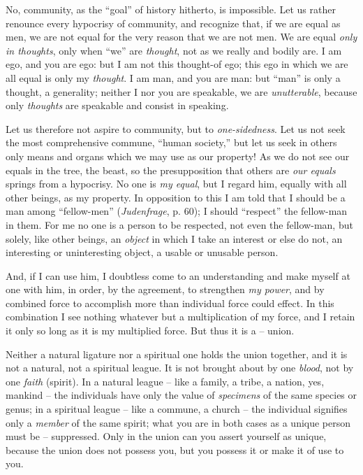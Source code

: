 \documentclass[12pt,a4paper]{book}
\begin{document}
No, community, as the ``goal'' of history hitherto, is impossible. Let us 
rather renounce every hypocrisy of community, and recognize that, if we are 
equal as men, we are not equal for the very reason that we are not men. We are 
equal \textit{only in thoughts}, only when ``we'' are \textit{thought}, not 
as we really and bodily are. I am ego, and you are ego: but I am not this 
thought-of ego; this ego in which we are all equal is only my 
\textit{thought}. I am man, and you are man: but ``man'' is only a thought, 
a generality; neither I nor you are speakable, we are \textit{unutterable}, 
because only \textit{thoughts} are speakable and consist in speaking.

Let us therefore not aspire to community, but to \textit{one-sidedness}. Let 
us not seek the most comprehensive commune, ``human society,'' but let us 
seek in others only means and organs which we may use as our property! As we 
do not see our equals in the tree, the beast, so the presupposition that 
others are \textit{our equals} springs from a hypocrisy. No one is \textit{my 
equal}, but I regard him, equally with all other beings, as my property. In 
opposition to this I am told that I should be a man among ``fellow-men'' 
(\textit{Judenfrage}, p. 60); I should ``respect'' the fellow-man in them. 
For me no one is a person to be respected, not even the fellow-man, but 
solely, like other beings, an \textit{object} in which I take an interest or 
else do not, an interesting or uninteresting object, a usable or unusable 
person.

And, if I can use him, I doubtless come to an understanding and make myself at 
one with him, in order, by the agreement, to strengthen \textit{my power}, and 
by combined force to accomplish more than individual force could effect. In 
this combination I see nothing whatever but a multiplication of my force, and 
I retain it only so long as it is my multiplied force. But thus it is a -- 
union.

Neither a natural ligature nor a spiritual one holds the union together, and 
it is not a natural, not a spiritual league. It is not brought about by one 
\textit{blood}, not by one \textit{faith} (spirit). In a natural league -- 
like a family, a tribe, a nation, yes, mankind -- the individuals have only 
the value of \textit{specimens} of the same species or genus; in a spiritual 
league -- like a commune, a church -- the individual signifies only a 
\textit{member} of the same spirit; what you are in both cases as a unique 
person must be -- suppressed. Only in the union can you assert yourself as 
unique, because the union does not possess you, but you possess it or make it 
of use to you.
\end{document}
